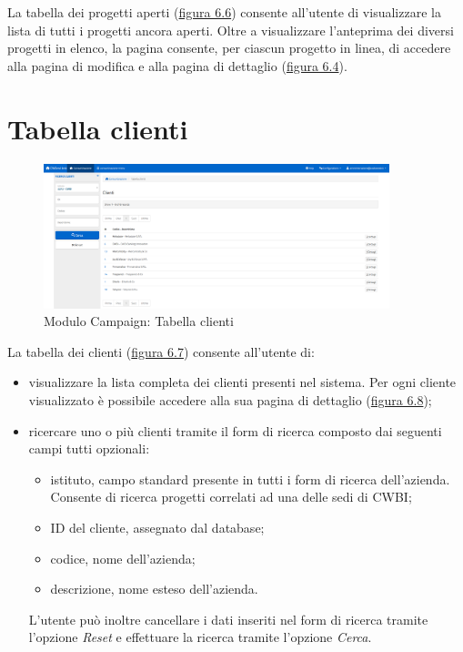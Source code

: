 \noindent La tabella dei progetti aperti ({\hyperref[fig:tabellaProgettiAperti]{figura 6.6}}) consente all'utente di visualizzare la lista di tutti i progetti ancora aperti. Oltre a visualizzare l'anteprima dei diversi progetti in elenco, la pagina consente, per ciascun progetto in linea, di accedere alla pagina di modifica e alla pagina di dettaglio ({\hyperref[fig:dettaglioProgetto]{figura 6.4}}).  

\section{Tabella clienti}
\begin{figure}[!h]
\centering
\includegraphics[width=380px]{../images/UI/08-tabellaClienti.png}
\caption{Modulo Campaign: Tabella clienti}
\label{fig:tabellaClienti}
\end{figure}

\noindent La tabella dei clienti ({\hyperref[fig:tabellaClienti]{figura 6.7}}) consente all'utente di:
\begin{itemize}
\item visualizzare la lista completa dei clienti presenti nel sistema. Per ogni cliente visualizzato è possibile accedere alla sua pagina di dettaglio ({\hyperref[fig:dettaglioCliente1]{figura 6.8}}); 
\item ricercare uno o più clienti tramite il form di ricerca composto dai seguenti campi tutti opzionali:
\begin{itemize}
\item istituto, campo standard presente in tutti i form di ricerca dell'azienda. Consente di ricerca progetti correlati ad una delle sedi di CWBI;
\item ID del cliente, assegnato dal database;
\item codice, nome dell'azienda;
\item descrizione, nome esteso dell'azienda.
\end{itemize}
L'utente può inoltre cancellare i dati inseriti nel form di ricerca tramite l'opzione \textit{Reset} e effettuare la ricerca tramite l'opzione \textit{Cerca}.
\end{itemize}

